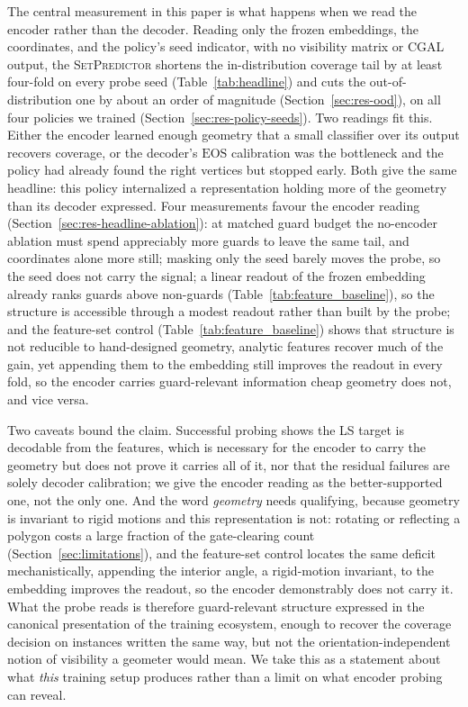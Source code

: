 \documentclass[11pt]{article}
\newcommand{\EOS}{\mathrm{EOS}}
\newcommand{\SetPredictor}{\textup{\textsc{SetPredictor}}}
\begin{document}
The central measurement in this paper is what happens when we read the encoder rather than the decoder. Reading only the frozen embeddings, the coordinates, and the policy's seed indicator, with no visibility matrix or CGAL output, the \SetPredictor{} shortens the in-distribution coverage tail by at least four-fold on every probe seed (Table~\ref{tab:headline}) and cuts the out-of-distribution one by about an order of magnitude (Section~\ref{sec:res-ood}), on all four policies we trained (Section~\ref{sec:res-policy-seeds}). Two readings fit this. Either the encoder learned enough geometry that a small classifier over its output recovers coverage, or the decoder's $\EOS$ calibration was the bottleneck and the policy had already found the right vertices but stopped early. Both give the same headline: this policy internalized a representation holding more of the geometry than its decoder expressed. Four measurements favour the encoder reading (Section~\ref{sec:res-headline-ablation}): at matched guard budget the no-encoder ablation must spend appreciably more guards to leave the same tail, and coordinates alone more still; masking only the seed barely moves the probe, so the seed does not carry the signal; a linear readout of the frozen embedding already ranks guards above non-guards (Table~\ref{tab:feature_baseline}), so the structure is accessible through a modest readout rather than built by the probe; and the feature-set control (Table~\ref{tab:feature_baseline}) shows that structure is not reducible to hand-designed geometry, analytic features recover much of the gain, yet appending them to the embedding still improves the readout in every fold, so the encoder carries guard-relevant information cheap geometry does not, and vice versa.

Two caveats bound the claim. Successful probing shows the LS target is decodable from the features, which is necessary for the encoder to carry the geometry but does not prove it carries all of it, nor that the residual failures are solely decoder calibration; we give the encoder reading as the better-supported one, not the only one. And the word \emph{geometry} needs qualifying, because geometry is invariant to rigid motions and this representation is not: rotating or reflecting a polygon costs a large fraction of the gate-clearing count (Section~\ref{sec:limitations}), and the feature-set control locates the same deficit mechanistically, appending the interior angle, a rigid-motion invariant, to the embedding improves the readout, so the encoder demonstrably does not carry it. What the probe reads is therefore guard-relevant structure expressed in the canonical presentation of the training ecosystem, enough to recover the coverage decision on instances written the same way, but not the orientation-independent notion of visibility a geometer would mean. We take this as a statement about what \emph{this} training setup produces rather than a limit on what encoder probing can reveal.
\end{document}

